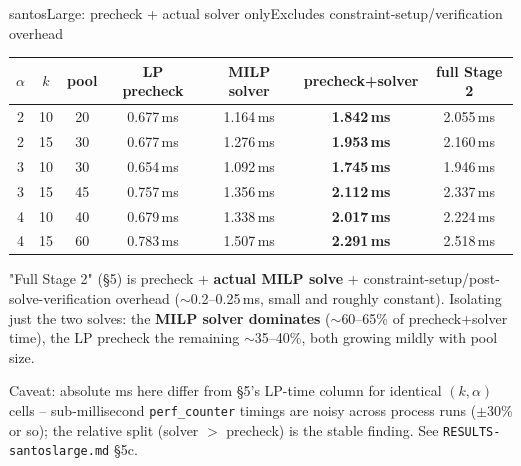 \documentclass[aspectratio=169,10pt]{beamer}
\newcommand{\highlight}[1]{{\color{Cat1}\bfseries #1}}
\begin{document}
\begin{frame}{santosLarge: precheck + actual solver only}{Excludes constraint-setup/verification overhead}
\footnotesize
\begin{center}
\begin{tabular}{ccccccc}
\toprule
$\alpha$ & $k$ & pool & LP precheck & MILP solver & precheck+solver & full Stage 2 \\
\midrule
2 & 10 & 20 & 0.677\,ms & 1.164\,ms & \textbf{1.842\,ms} & 2.055\,ms \\
2 & 15 & 30 & 0.677\,ms & 1.276\,ms & \textbf{1.953\,ms} & 2.160\,ms \\
3 & 10 & 30 & 0.654\,ms & 1.092\,ms & \textbf{1.745\,ms} & 1.946\,ms \\
3 & 15 & 45 & 0.757\,ms & 1.356\,ms & \textbf{2.112\,ms} & 2.337\,ms \\
4 & 10 & 40 & 0.679\,ms & 1.338\,ms & \textbf{2.017\,ms} & 2.224\,ms \\
4 & 15 & 60 & 0.783\,ms & 1.507\,ms & \textbf{2.291\,ms} & 2.518\,ms \\
\bottomrule
\end{tabular}
\end{center}

\vspace{4pt}
\small\color{Ink2}
"Full Stage 2" (§5) is precheck + \highlight{actual MILP solve} + constraint-setup/post-solve-verification overhead ($\sim$0.2--0.25\,ms, small and roughly constant). Isolating just the two solves: the \highlight{MILP solver dominates} ($\sim$60--65\% of precheck+solver time), the LP precheck the remaining $\sim$35--40\%, both growing mildly with pool size.

\vspace{2pt}
{\footnotesize\color{Muted} Caveat: absolute ms here differ from \S5's LP-time column for identical $(k,\alpha)$ cells -- sub-millisecond \texttt{perf\_counter} timings are noisy across process runs ($\pm$30\% or so); the relative split (solver $>$ precheck) is the stable finding. See \texttt{RESULTS-santoslarge.md} \S5c.}
\end{frame}
\end{document}

